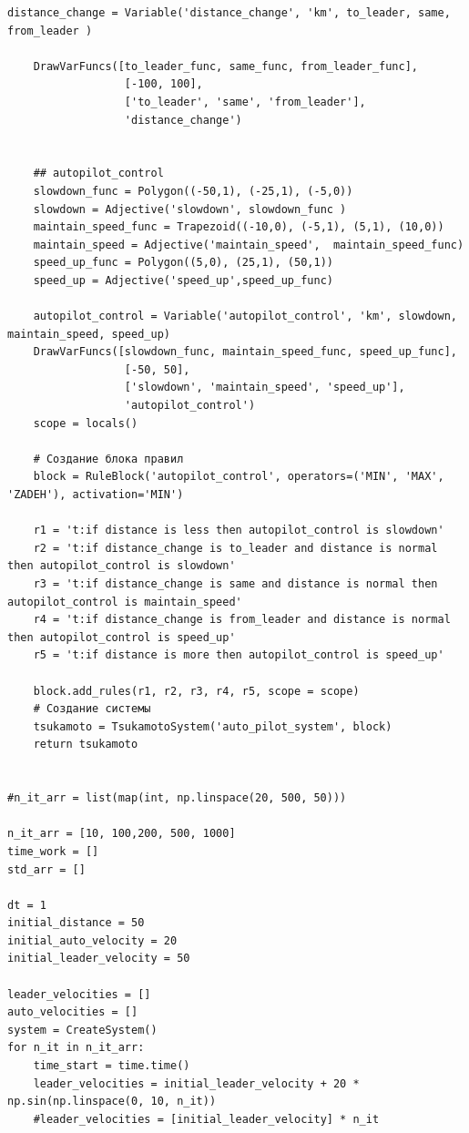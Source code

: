 \documentclass[12pt]{report}
\begin{document}
\begin{lstlisting}[label=lst:dt,caption=Реализация решения поставленной задачи]
    distance_change = Variable('distance_change', 'km', to_leader, same, from_leader )
    
    DrawVarFuncs([to_leader_func, same_func, from_leader_func],
                  [-100, 100],
                  ['to_leader', 'same', 'from_leader'],
                  'distance_change')

    
    ## autopilot_control
    slowdown_func = Polygon((-50,1), (-25,1), (-5,0))
    slowdown = Adjective('slowdown', slowdown_func )
    maintain_speed_func = Trapezoid((-10,0), (-5,1), (5,1), (10,0))
    maintain_speed = Adjective('maintain_speed',  maintain_speed_func)
    speed_up_func = Polygon((5,0), (25,1), (50,1))
    speed_up = Adjective('speed_up',speed_up_func)
          
    autopilot_control = Variable('autopilot_control', 'km', slowdown, maintain_speed, speed_up)
    DrawVarFuncs([slowdown_func, maintain_speed_func, speed_up_func],
                  [-50, 50],
                  ['slowdown', 'maintain_speed', 'speed_up'],
                  'autopilot_control')
    scope = locals()

    # Создание блока правил
    block = RuleBlock('autopilot_control', operators=('MIN', 'MAX', 'ZADEH'), activation='MIN')

    r1 = 't:if distance is less then autopilot_control is slowdown'
    r2 = 't:if distance_change is to_leader and distance is normal then autopilot_control is slowdown'
    r3 = 't:if distance_change is same and distance is normal then autopilot_control is maintain_speed'
    r4 = 't:if distance_change is from_leader and distance is normal then autopilot_control is speed_up'
    r5 = 't:if distance is more then autopilot_control is speed_up'
    
    block.add_rules(r1, r2, r3, r4, r5, scope = scope)
    # Создание системы
    tsukamoto = TsukamotoSystem('auto_pilot_system', block)
    return tsukamoto


#n_it_arr = list(map(int, np.linspace(20, 500, 50)))

n_it_arr = [10, 100,200, 500, 1000]
time_work = []
std_arr = []

dt = 1 
initial_distance = 50
initial_auto_velocity = 20 
initial_leader_velocity = 50

leader_velocities = []
auto_velocities = []
system = CreateSystem()
for n_it in n_it_arr:
    time_start = time.time()
    leader_velocities = initial_leader_velocity + 20 * np.sin(np.linspace(0, 10, n_it))
    #leader_velocities = [initial_leader_velocity] * n_it
    

\end{lstlisting}
\end{document}

